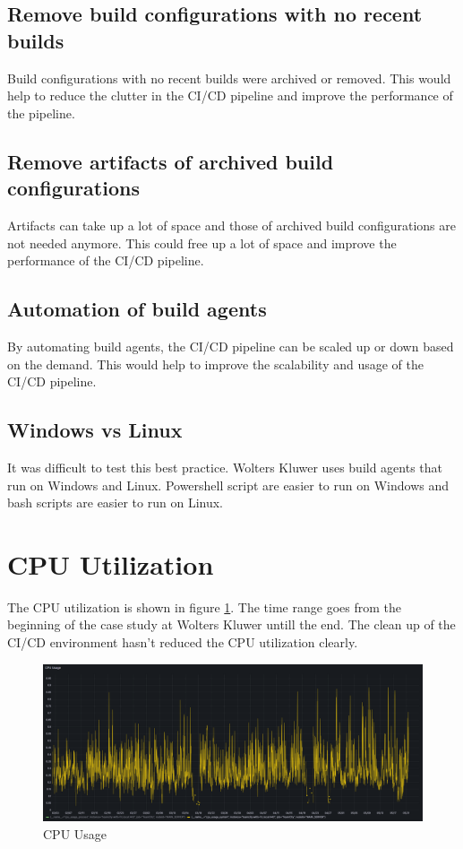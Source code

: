 \subsection{Remove build configurations with no recent builds}%
\label{sub:remove-build-configurations-with-no-recent-builds}
Build configurations with no recent builds were archived or removed. This would help to reduce the clutter in the CI/CD pipeline and improve the performance of the pipeline.

\subsection{Remove artifacts of archived build configurations}%
\label{sub:remove-artifacts-of-archived-build-configurations}
Artifacts can take up a lot of space and those of archived build configurations are not needed anymore. This could free up a lot of space and improve the performance of the CI/CD pipeline.

\subsection{Automation of build agents}%
\label{sub:automation-of-build-agents}
By automating build agents, the CI/CD pipeline can be scaled up or down based on the demand. This would help to improve the scalability and usage of the CI/CD pipeline.

\subsection{Windows vs Linux}%
\label{sub:windows-vs-linux}
It was difficult to test this best practice. Wolters Kluwer uses build agents that run on Windows and Linux. Powershell script are easier to run on Windows and bash scripts are easier to run on Linux.


\section{CPU Utilization}%
\label{sec:cpu-utilization}

The CPU utilization is shown in figure \ref{fig:cpu}. The time range goes from the beginning of the case study at Wolters Kluwer untill the end. The clean up of the CI/CD environment hasn't reduced the CPU utilization clearly.

\begin{figure}[htbp]
    \centering
    \includegraphics[width=\textwidth]{graphics/cpu.png}
    \caption{CPU Usage}
    \label{fig:cpu}
\end{figure}

